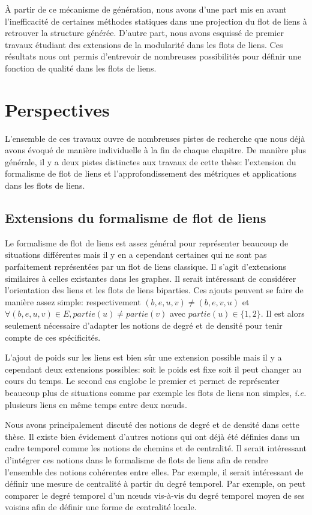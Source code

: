 \`A partir de ce mécanisme de génération, nous avons d'une part mis en avant l'inefficacité de certaines méthodes statiques dans une projection du flot de liens à retrouver la structure générée.
D'autre part, nous avons esquissé de premier travaux étudiant des extensions de la modularité dans les flots de liens.
Ces résultats nous ont permis d'entrevoir de nombreuses possibilités pour définir une fonction de qualité dans les flots de liens.

\section{Perspectives}

L'ensemble de ces travaux ouvre de nombreuses pistes de recherche que nous déjà avons évoqué de manière individuelle à la fin de chaque chapitre.
De manière plus générale, il y a deux pistes distinctes aux travaux de cette thèse: l'extension du formalisme de flot de liens et l'approfondissement des métriques et applications dans les flots de liens.

\subsection{Extensions du formalisme de flot de liens}

Le formalisme de flot de liens est assez général pour représenter beaucoup de situations différentes mais il y en a cependant certaines qui ne sont pas parfaitement représentées par un flot de liens classique.
Il s'agit d'extensions similaires à celles existantes dans les graphes.
Il serait intéressant de considérer l'orientation des liens et les flots de liens biparties.
Ces ajouts peuvent se faire de manière assez simple: respectivement $(b,e,u,v)\neq (b,e,v,u)$ et $\forall (b,e,u,v) \in E, partie(u)\neq partie(v)$ avec $partie(u) \in \{1,2\}$.
Il est alors seulement nécessaire d'adapter les notions de degré et de densité pour tenir compte de ces spécificités.

L'ajout de poids sur les liens est bien sûr une extension possible mais il y a cependant deux extensions possibles: soit le poids est fixe soit il peut changer au cours du temps.
Le second cas englobe le premier et permet de représenter beaucoup plus de situations comme par exemple les flots de liens non simples, \emph{i.e.} plusieurs liens en même temps entre deux n\oe uds.

Nous avons principalement discuté des notions de degré et de densité dans cette thèse.
Il existe bien évidement d'autres notions qui ont déjà été définies dans un cadre temporel comme les notions de chemins et de centralité.
Il serait intéressant d'intégrer ces notions dans le formalisme de flots de liens afin de rendre l'ensemble des notions cohérentes entre elles.
Par exemple, il serait intéressant de définir une mesure de centralité à partir du degré temporel.
Par exemple, on peut comparer le degré temporel d'un n\oe uds vis-à-vis du degré temporel moyen de ses voisins afin de définir une forme de centralité locale.

